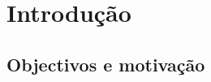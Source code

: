 \clearpage

\chapter{\textbf{Introdução}}\label{objectives}
\blindtext

\section{Objectivos e motivação}
\blindtext

